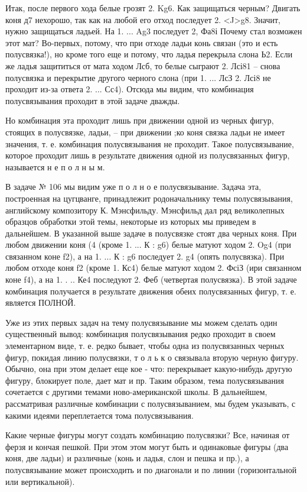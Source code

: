 Итак, после первого хода белые грозят 2. Kg6. Как защищаться черным? Двигать коня д7 нехорошо, так как на любой его отход последует 2. <J>g8. Значит, нужно защищаться ладьей. На 1. ... Ag3 последует 2, Фа8і Почему стал возможен этот мат? Во-первых, потому, что при отходе ладьи конь связан (это и есть полусвязка!), но кроме того еще и потому, что ладья перекрыла слона Ь2. Если же ладья защититься от мата ходом Лсб, то белые сыграют 2. Лсі81 -- снова полусвязка и перекрытие другого черного слона (при 1. ... ЛсЗ 2. Лсі8 не проходит из-за ответа 2. ... Сс4). Отсюда мы видим, что комбинация полусвязывания проходит в этой задаче дважды.

Но комбинация эта проходит лишь при движении одной из черных фигур, стоящих в полусвязке, ладьи, -- при движении ;ко коня связка ладьи не имеет значения, т. е. комбинация полусвязывания не проходит. Такое полусвязывание, которое проходит лишь в результате движения одной из полусвязанных фигур, называется н е п о л н ы м.

В задаче № 106 мы видим уже п о л н о е полусвязывание. Задача эта, построенная на цугцванге, принадлежит родоначальнику темы полусвязывания, английскому композитору К. Мэнсфильду. Мэнсфильд дал ряд великолепных образцов обработки этой темы, некоторые из которых мы приведем в дальнейшем. В указанной выше задаче в полусвязке стоят два черных коня. При любом движении коня (4 (кроме 1. ... К : g6) белые матуют ходом 2. Og4 (при связанном коне f2), а на 1. ... К : g6 последует 2. g4 (опять полусвязка). При любом отходе коня f2 (кроме 1. Кс4) белые матуют ходом 2. ФсіЗ (ири связанном коне f4), а на 1. . .. Ке4 последуют 2. Феб (четвертая полусвязка). В этой задаче комбинация получается в результате движения обеих полусвязанных фигур, т. е. является ПОЛНОЙ.

Уже из этих первых задач на тему полусвязывание мы можем сделать один существенный вывод: комбинация полусвязывания редко проходит в своем элементарном виде, т. е. редко бывает, чтобы одна из полусвязанных черных фигур, покидая линию полусвязки, т о л ь к о связывала вторую черную фигуру. Обычно, она при этом делает еще кое - что: перекрывает какую-нибудь другую фигуру, блокирует поле, дает мат и пр. Таким образом, тема полусвязывания сочетается с другими темами ново-американской школы. В дальнейшем, рассматривая различные комбинации с полусвязыванием, мы будем указывать, с какими идеями переплетается тома полусвязывания.

Какие черные фигуры могут создать комбинацию полусвязки? Все, начиная от ферзя и кончая пешкой. При этом этом могут быть и одинаковые фигуры (два коня, две ладьи) и различные (конь и ладья, слон и пешка и пр.), а полусвязывание может происходить и по диагонали и по линии (горизонтальной или вертикальной).

